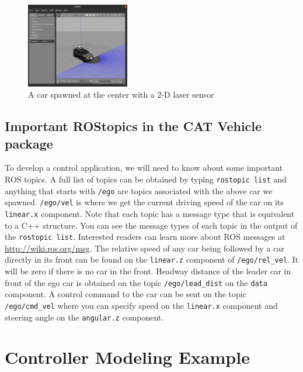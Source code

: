 \documentclass[
]{article}
\begin{document}
\begin{figure}[htbp]
\centering
\includegraphics[width=0.4\textwidth]{Gazebo_003.png}
\caption{A car spawned at the center with a 2-D laser sensor}
\label{fig:Gazebo_003.png}
\end{figure}

\hypertarget{important-rostopics-in-the-cat-vehicle-package}{%
\subsection{Important ROStopics in the CAT Vehicle
package}\label{important-rostopics-in-the-cat-vehicle-package}}

To develop a control application, we will need to know about some
important ROS topics. A full list of topics can be obtained by typing
\texttt{rostopic\ list} and anything that starts with \texttt{/ego} are
topics associated with the above car we spawned. \texttt{/ego/vel} is
where we get the current driving speed of the car on its
\texttt{linear.x} component. Note that each topic has a message type
that is equivalent to a C++ structure. You can see the message types of
each topic in the output of the \texttt{rostopic\ list}. Interested
readers can learn more about ROS messages at
\url{http://wiki.ros.org/msg}. The relative speed of any car being
followed by a car directly in its front can be found on the
\texttt{linear.z} component of \texttt{/ego/rel\_vel}. It will be zero
if there is no car in the front. Headway distance of the leader car in
front of the ego car is obtained on the topic \texttt{/ego/lead\_dist}
on the \texttt{data} component. A control command to the car can be sent
on the topic \texttt{/ego/cmd\_vel} where you can specify speed on the
\texttt{linear.x} component and steering angle on the \texttt{angular.z}
component.

\hypertarget{controller-modeling-example}{%
\section{Controller Modeling
Example}\label{controller-modeling-example}}
\end{document}
